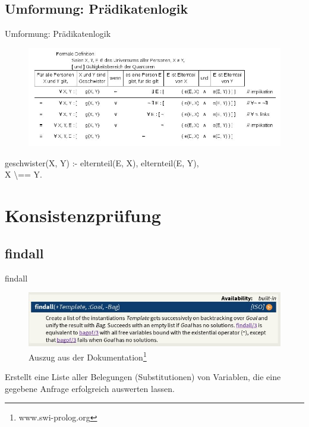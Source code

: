 \documentclass[pdf]{beamer}
\begin{document}
	\subsection{Umformung: Prädikatenlogik}
		
	\begin{frame}[t]{Umformung: Prädikatenlogik}

		\begin{figure}[!ht]
  		\includegraphics[width=\textwidth]{img/umformung}
		\end{figure}\pause\pause
		
		\centering
		geschwister(X, Y) :- elternteil(E, X), elternteil(E, Y), \\ 
		X \textbackslash == Y.
		
	\end{frame}
		
		


	\section{Konsistenzprüfung}
	\subsection{findall}

	\begin{frame}[t]{findall}

		\begin{figure}[!ht]
  		\includegraphics[width=\textwidth]{img/findall} \\
  		Auszug aus der Dokumentation\footnote{www.swi-prolog.org}
		\end{figure}
		
		Erstellt eine Liste aller Belegungen (Substitutionen) von Variablen,
		die eine gegebene Anfrage erfolgreich auswerten lassen.


	\end{frame}
\end{document}
